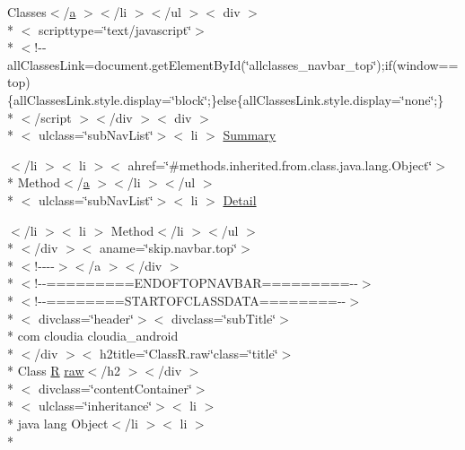 \begin{DoxyCompactItemize}
\item 
Classes$<$/\hyperlink{style_8css_a5e8981582017bb8b84c21f148345d1f7}{a} $>$$<$/li $>$$<$/ul $>$$<$ div $>$\\*
$<$ scripttype=\char`\"{}text/javascript\char`\"{}$>$\\*
$<$!-\/-\/all\-Classes\-Link=document.\-get\-Element\-By\-Id(\char`\"{}allclasses\-\_\-navbar\-\_\-top\char`\"{});if(window==top)\{all\-Classes\-Link.\-style.\-display=\char`\"{}block\char`\"{};\}else\{all\-Classes\-Link.\-style.\-display=\char`\"{}none\char`\"{};\}\\*
$<$/script $>$$<$/div $>$$<$ div $>$\\*
$<$ ulclass=\char`\"{}sub\-Nav\-List\char`\"{}$>$$<$ li $>$ \hyperlink{_r_8raw_8html_a6f9ab45abc9b0679dc1b132fbacfc681}{Summary}
\item 
$<$/li $>$$<$ li $>$$<$ ahref=\char`\"{}\#methods.\-inherited.\-from.\-class.\-java.\-lang.\-Object\char`\"{}$>$\\*
 Method$<$/\hyperlink{style_8css_a5e8981582017bb8b84c21f148345d1f7}{a} $>$$<$/li $>$$<$/ul $>$\\*
$<$ ulclass=\char`\"{}sub\-Nav\-List\char`\"{}$>$$<$ li $>$ \hyperlink{_r_8raw_8html_aed0df2ae11502bf9389ac3cf53b1c0f6}{Detail}
\item 
$<$/li $>$$<$ li $>$ Method$<$/li $>$$<$/ul $>$\\*
$<$/div $>$$<$ aname=\char`\"{}skip.\-navbar.\-top\char`\"{}$>$\\*
$<$!-\/-\/-\/-\/$>$$<$/a $>$$<$/div $>$\\*
$<$!-\/-\/=========E\-N\-D\-O\-F\-T\-O\-P\-N\-A\-V\-B\-A\-R=========-\/-\/$>$\\*
$<$!-\/-\/========S\-T\-A\-R\-T\-O\-F\-C\-L\-A\-S\-S\-D\-A\-T\-A========-\/-\/$>$\\*
$<$ divclass=\char`\"{}header\char`\"{}$>$$<$ divclass=\char`\"{}sub\-Title\char`\"{}$>$\\*
 com cloudia cloudia\-\_\-android\\*
$<$/div $>$$<$ h2title=\char`\"{}Class\-R.\-raw\char`\"{}class=\char`\"{}title\char`\"{}$>$\\*
 Class \hyperlink{index-16_8html_a31e8fe59be5c20ce90a0090e28a0c1fe}{R} \hyperlink{index-16_8html_ae84fa9c4fed0bf708a919a3728c8e4de}{raw}$<$/h2 $>$$<$/div $>$\\*
$<$ divclass=\char`\"{}content\-Container\char`\"{}$>$\\*
$<$ ulclass=\char`\"{}inheritance\char`\"{}$>$$<$ li $>$\\*
 java lang Object$<$/li $>$$<$ li $>$\\*
$$
\end{DoxyCompactItemize}
